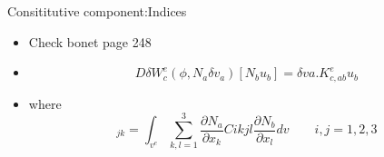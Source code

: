  
 	\begin{frame}{Consititutive component:Indices}
 		\begin{itemize}
 			\item Check bonet page 248
 			\item 
 			\begin{equation}
 			D\delta W_c^e(\phi,N_a\delta v_a)[N_bu_b] = \delta va. K^e_{c,ab} u_b
 			\end{equation}
 			\item where
 			\begin{equation}
 			[K_{c,ab}]_{jk} = \int_{v^e} \sum_{k,l=1}^{3} \frac{\partial N_a}{\partial x_k} Cikjl \frac{\partial N_b}{\partial x_l} dv \qquad i,j = 1,2,3
 			\end{equation}
 		\end{itemize}
 	\end{frame}